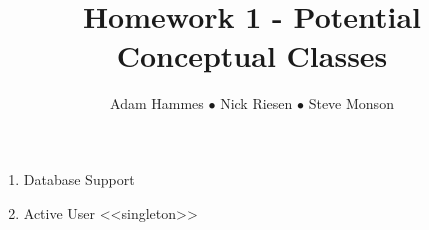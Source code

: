 \documentclass{article}
\title{Homework 1 - Potential Conceptual Classes}
\author{Adam Hammes $\bullet$ Nick Riesen $\bullet$ Steve Monson}
\begin{document}
\maketitle

\begin{enumerate}
    \item Database Support
    \item Active User <<singleton>>
\end{enumerate}
\end{document}
